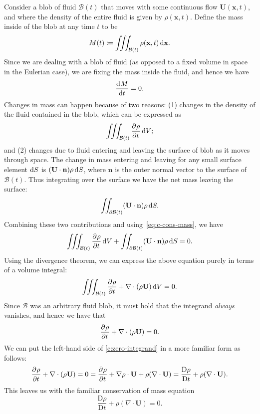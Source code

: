 \documentclass{article}
\def\*#1{\mathbf{#1}}
\newcommand{\B}{\mathcal{B}}
\newcommand{\dadvd}[2]{\dfrac{\text{D} #1}{\text{D} #2}} %
\begin{document}
Consider a blob of fluid $\B(t)$ that moves with some continuous flow
$\*U(\*x, t)$, and where the density of the entire fluid is given by
$\rho(\*x, t)$. Define the mass inside of the blob at any time $t$
to be
%
\begin{equation*}
    M(t) \coloneqq \iiint_{\B(t)} \rho(\*x, t) \dif \*x
    .
\end{equation*}
%
Since we are dealing with a blob of fluid (as opposed to a fixed volume
in space in the Eulerian case), we are fixing the mass inside the fluid,
and hence we have
%
\begin{equation}
    \dod{M}{t} = 0
    .
    \label{eq:c-cons-mass}
\end{equation}
%
Changes in mass can happen because of two reasons: (1) changes in the
density of the fluid contained in the blob, which can be expressed as
%
\begin{equation*}
    \iiint_{\B(t)} \dpd{\rho}{t} \dif V
    ;
\end{equation*}
%
and (2) changes due to fluid entering and leaving the surface of blob as
it moves through space. The change in mass entering and leaving for any
small surface element $\dif S$ is $(\*U \cdot \*n) \rho \dif S$, where
$\*n$ is the outer normal vector to the surface of $\B(t)$. Thus
integrating over the surface we have the net mass leaving the surface:
%
\begin{equation*}
    \iint_{\partial \B(t)} (\*U \cdot \*n) \rho \dif S
    .
\end{equation*}
%
Combining these two contributions and using~\eqref{eq:c-cons-mass}, we have
%
\begin{equation*}
    \iiint_{\B(t)} \dpd{\rho}{t} \dif V
    +
    \iint_{\partial \B(t)} (\*U \cdot \*n) \rho \dif S
    = 0
    .
\end{equation*}
%
Using the divergence theorem, we can express the above equation purely
in terms of a volume integral:
%
\begin{equation*}
    \iiint_{\B(t)}
        \dpd{\rho}{t}
        +
        \nabla \cdot (\rho \*U)
    \dif V
    = 0
    .
\end{equation*}
%
Since $\B$ was an arbitrary fluid blob, it must hold that the integrand
\textit{always} vanishes, and hence we have that
%
\begin{equation}
    \dpd{\rho}{t}
    +
    \nabla \cdot (\rho \*U)
    = 0
    .
    \label{c:zero-integrand}
\end{equation}
%
We can put the left-hand side of \eqref{c:zero-integrand} in a more
familiar form as follows:
%
\begin{align*}
    \dpd{\rho}{t} + \nabla \cdot (\rho \*U) = 0
        = \dpd{\rho}{t} + \nabla \rho \cdot \*U + \rho (\nabla \cdot \*U)
        = \dadvd{\rho}{t} + \rho (\nabla \cdot \*U)
    .
\end{align*}
%
This leaves us with the familiar conservation of mass equation
%
\begin{equation*}
    \dadvd{\rho}{t} + \rho (\nabla \cdot \*U) = 0
    .
\end{equation*}
\end{document}

